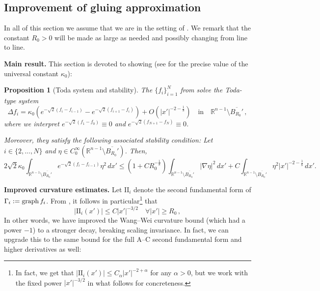 \documentclass{article}
\newcommand{\R}{\mathbb{R}}
\newtheorem{proposition}[theorem]{Proposition}
\theoremstyle{definition}
\begin{document}
\subsection{Improvement of gluing approximation}\label{sec:todaimprov}
In all of this section we assume that we are in the setting of . We remark that the constant $R_0>0$ will be made as large as needed and possibly changing from line to line.

{\bf Main result.}
This section is devoted to showing (see \cite{WW19,GuiWangWei2020} for the precise value of the universal constant $\kappa_0$):
\begin{proposition}[Toda system and stability]\label{prop:todaimprov}
The $\{f_i\}_{i=1}^N$ from  solve the Toda-type system
\begin{equation}\label{eq:todaimprov}
\Delta f_{i} = \kappa_0 \left(e^{-\sqrt{2}(f_i - f_{i-1})} - e^{-\sqrt{2}(f_{i+1} - f_i)}\right) + O\left(|x'|^{-2 - \frac{1}{8}}\right)\quad\mbox{in}\quad \R^{n-1}\setminus \overline{B_{R_0}'}\,,
\end{equation}
where we interpret $e^{-\sqrt{2}(f_1 - f_{0})}\equiv0$ and $e^{-\sqrt{2}(f_{N+1} - f_{N})}\equiv 0$.

Moreover, they satisfy the following associated stability condition:
Let $i\in\{2,...,N\}$ and $\eta \in C_0^\infty(\R^{n-1}\setminus \overline{B_{R_0}'})$. Then,
\begin{equation}\label{eq:todastabimprov}
2\sqrt{2} \kappa_0 \int_{\R^{n-1}\setminus \overline{B_{R_0}'}} e^{-\sqrt{2}(f_i - f_{i-1})} \eta^2\, dx'\leq \left(1 + CR_0^{-\frac{1}{8}}\right) \int_{\R^{n-1}\setminus \overline{B_{R_0}'}} |\nabla \eta|^2\,dx' + C \int_{\R^{n-1}\setminus \overline{B_{R_0}'}} \eta^2 |x'|^{-2-\frac{1}{8}} \,dx'.
\end{equation}
\end{proposition}
{\bf Improved curvature estimates.} Let $\mathrm{II}_i$ denote the second fundamental form of $\Gamma_i:={\rm graph}\, f_i$.
From , it follows in particular\footnote{In fact, we get that $|\mathrm{II}_i(x')| \leq C_\alpha|x'|^{-2+\alpha}$ for any $\alpha>0$, but we work with the fixed power $|x'|^{-3/2}$ in what follows for concreteness.} that
\begin{equation}\label{eq:iashgabg}
|\mathrm{II}_i(x')| \leq C|x'|^{-3/2} \quad \forall |x'| \geq R_0\,,
\end{equation}
In other words, we have improved the Wang--Wei curvature bound (which had a power $-1$) to a stronger decay, breaking scaling invariance. In fact, we can upgrade this to the same bound for the full A--C second fundamental form and higher derivatives as well:
\end{document}
